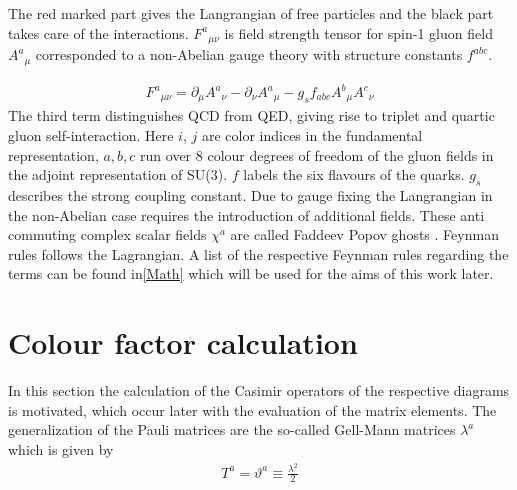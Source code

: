 The red marked part gives the Langrangian of free particles and the black part takes care of the interactions. ${F^a}_{\mu \nu}$ is field strength tensor for spin-1 gluon field $ {A^a}_{\mu} $ corresponded to a non-Abelian gauge theory with structure constants $ f^{abc} $.

\begin{equation}
\begin{split}
{F^a}_{\mu \nu}= \partial_\mu {A^a}_{\nu}-\partial_\nu {A^a}_{\mu}-g_s f_{abc} {A^b}_{\mu} {A^c}_{\nu}
\end{split}
\end{equation}
The third term distinguishes QCD from QED, giving rise to triplet and quartic gluon self-interaction.
Here $i$, $j$ are color indices in the fundamental representation, $a, b , c$ run over 8 colour degrees of freedom of the gluon fields in the adjoint representation of SU(3). $f$ labels the six flavours of the quarks. $ g_s $ describes the strong coupling constant. Due to gauge fixing the Langrangian in the non-Abelian case requires the introduction of additional fields. These anti commuting complex scalar fields $ {\chi^a} $ are called Faddeev Popov ghosts \cite{Schwartz:2013pla, peskin2018introduction}. Feynman rules follows the Lagrangian. A list of the respective Feynman rules regarding the terms can be found in\ref{Math}  which will be used for the aims of this work later.

%

\label{Feynman}

\pagebreak

\section{Colour factor calculation}
In this section the calculation of the Casimir operators of the respective diagrams is motivated, which occur later with the evaluation of the matrix elements. The generalization of the Pauli matrices are the so-called Gell-Mann matrices $\lambda ^a$ which is given by \cite{Schwartz:2013pla, Platzer:2018pmd}
\begin{equation}
\begin{split}
T^a = \vartheta^a \equiv \frac{\lambda ^2}{2}
\end{split}
\end{equation}

